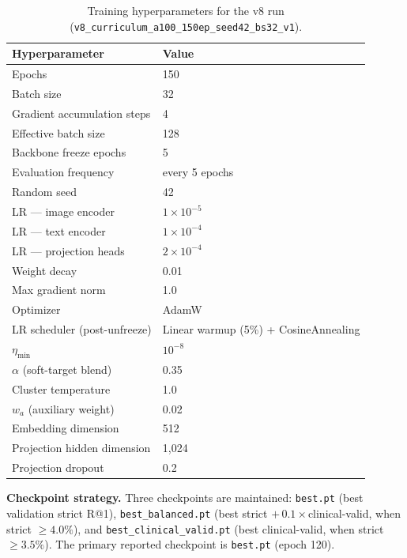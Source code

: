 \documentclass[11pt, a4paper]{article}
\begin{document}
\begin{table}[H]
  \centering
  \caption{Training hyperparameters for the v8 run
    (\texttt{v8\_curriculum\_a100\_150ep\_seed42\_bs32\_v1}).}
  \label{tab:hparams}
  \renewcommand{\arraystretch}{1.1}
  \begin{tabular}{ll}
    \toprule
    \textbf{Hyperparameter} & \textbf{Value} \\
    \midrule
    Epochs                          & 150 \\
    Batch size                      & 32 \\
    Gradient accumulation steps     & 4 \\
    Effective batch size            & 128 \\
    Backbone freeze epochs          & 5 \\
    Evaluation frequency            & every 5 epochs \\
    Random seed                     & 42 \\
    \midrule
    LR --- image encoder            & $1\times10^{-5}$ \\
    LR --- text encoder             & $1\times10^{-4}$ \\
    LR --- projection heads         & $2\times10^{-4}$ \\
    Weight decay                    & 0.01 \\
    Max gradient norm               & 1.0 \\
    Optimizer                       & AdamW \\
    LR scheduler (post-unfreeze)    & Linear warmup (5\%) + CosineAnnealing \\
    $\eta_{\min}$                   & $10^{-8}$ \\
    \midrule
    $\alpha$ (soft-target blend)    & 0.35 \\
    Cluster temperature             & 1.0 \\
    $w_a$ (auxiliary weight)        & 0.02 \\
    \midrule
    Embedding dimension             & 512 \\
    Projection hidden dimension     & 1,024 \\
    Projection dropout              & 0.2 \\
    \bottomrule
  \end{tabular}
\end{table}

\textbf{Checkpoint strategy.}
Three checkpoints are maintained:
\texttt{best.pt} (best validation strict R@1),
\texttt{best\_balanced.pt} (best strict $+\,0.1\times$clinical-valid,
when strict $\geq4.0\%$), and
\texttt{best\_clinical\_valid.pt} (best clinical-valid, when
strict $\geq3.5\%$).
The primary reported checkpoint is \texttt{best.pt} (epoch 120).
\end{document}
